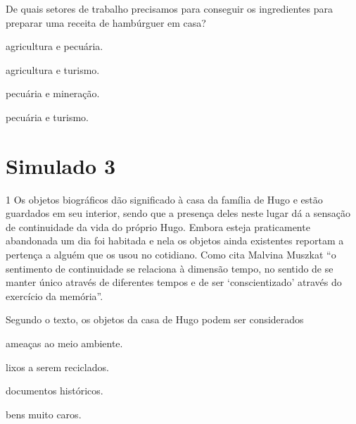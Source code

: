 De quais setores de trabalho precisamos para conseguir os ingredientes
para preparar uma receita de hambúrguer em casa?

\begin{escolha}
\item agricultura e pecuária.

\item agricultura e turismo.

\item pecuária e mineração.

\item pecuária e turismo.
\end{escolha}


\chapter{Simulado 3}

\num{1} Os objetos biográficos dão significado à casa da família de Hugo e
estão guardados em seu interior, sendo que a presença deles neste lugar
dá a sensação de continuidade da vida do próprio Hugo. Embora esteja
praticamente abandonada um dia foi habitada e nela os objetos ainda
existentes reportam a pertença a alguém que os usou no cotidiano. Como
cita Malvina Muszkat ``o sentimento de continuidade se relaciona à
dimensão tempo, no sentido de se manter único através de diferentes
tempos e de ser `conscientizado' através do exercício da memória''.


Segundo o texto, os objetos da casa de Hugo podem ser considerados

\begin{escolha}
\item ameaças ao meio ambiente.

\item lixos a serem reciclados.

\item documentos históricos.

\item bens muito caros.
\end{escolha}

